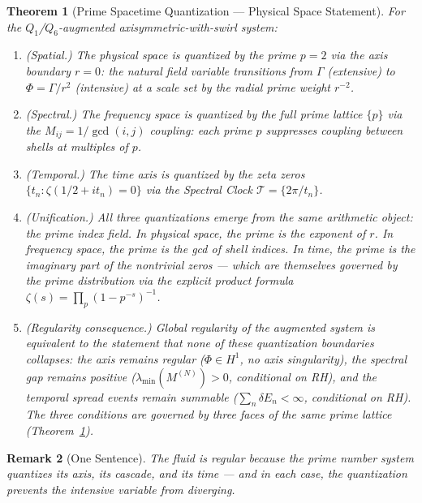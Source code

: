 \documentclass[11pt]{article}
\newtheorem{theorem}{Theorem}[section]
\newtheorem{remark}[theorem]{Remark}
\begin{document}
\begin{theorem}[Prime Spacetime Quantization --- Physical Space Statement]\label{thm:quantized}
For the $Q_1$/$Q_6$-augmented axisymmetric-with-swirl system:
\begin{enumerate}[label=(\arabic*)]
\item \textup{(Spatial.)} The physical space is quantized by the prime $p=2$
  via the axis boundary $r=0$: the natural field variable transitions from
  $\Gamma$ (extensive) to $\Phi=\Gamma/r^2$ (intensive) at a scale set
  by the radial prime weight $r^{-2}$.

\item \textup{(Spectral.)} The frequency space is quantized by the full
  prime lattice $\{p\}$ via the $M_{ij}=1/\gcd(i,j)$ coupling:
  each prime $p$ suppresses coupling between shells at multiples of $p$.

\item \textup{(Temporal.)} The time axis is quantized by the zeta zeros
  $\{t_n:\zeta(1/2+it_n)=0\}$ via the Spectral Clock $\mathcal{T}=\{2\pi/t_n\}$.

\item \textup{(Unification.)} All three quantizations emerge from the
  same arithmetic object: the prime index field.
  In physical space, the prime is the exponent of $r$.
  In frequency space, the prime is the gcd of shell indices.
  In time, the prime is the imaginary part of the nontrivial zeros ---
  which are themselves governed by the prime distribution via the
  explicit product formula $\zeta(s)=\prod_p(1-p^{-s})^{-1}$.

\item \textup{(Regularity consequence.)} Global regularity of the
  augmented system is equivalent to the statement that none of these
  quantization boundaries collapses: the axis remains regular
  ($\Phi\in H^1$, no axis singularity), the spectral gap remains positive
  ($\lambda_{\min}(M^{(N)})>0$, conditional on RH), and the temporal
  spread events remain summable ($\sum_n\delta E_n<\infty$, conditional on RH).
  The three conditions are governed by three faces of the same prime lattice (Theorem~\ref{thm:quantized}).
\end{enumerate}
\end{theorem}

\begin{remark}[One Sentence]
The fluid is regular because the prime number system quantizes its axis,
its cascade, and its time --- and in each case, the quantization prevents
the intensive variable from diverging.
\end{remark}
\end{document}
